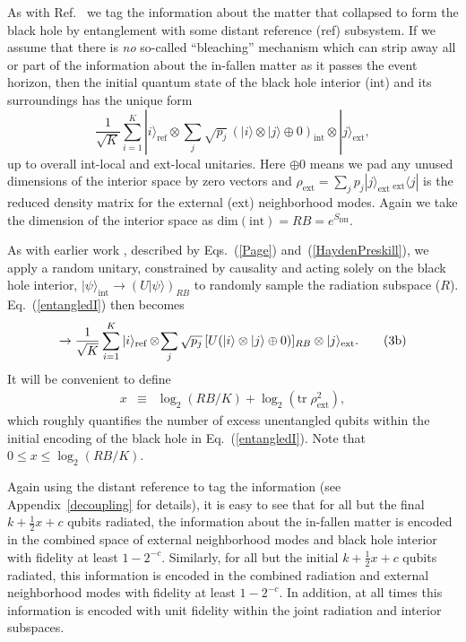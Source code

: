 \documentclass[twocolumn,aps,prl,amsmath,amssymb,floatfix]{revtex4}
\begin{document}
As with Ref.~ we tag the information about the
matter that collapsed to form the black hole by entanglement with
some distant reference (ref) subsystem. If we assume that there is
{\it no\/} so-called ``bleaching'' mechanism which can strip
away all or part of the information about the in-fallen matter as it
passes the event horizon, then the initial quantum state of the black hole
interior (int) and its surroundings has the unique form \cite{me}
\begin{equation}
\frac{1}{\sqrt{K}}\sum_{i=1}^K |i\rangle_{\text{ref}}\otimes
\sum_{j}\sqrt{p_j}\,(|i\rangle\otimes |j\rangle\oplus 0)_{\text{int}}
\otimes|j\rangle_{\text{ext}}, \tag{3a} \label{entangledI}
\end{equation}
up to overall int-local and ext-local unitaries.
Here $\oplus 0$ means we pad any unused dimensions of the interior
space by zero vectors \cite{me} and
$\rho_{\text{ext}}=\sum_jp_j|j\rangle_{\text{ext}}%
\,{}_{\text{ext}}\!\langle j|$
is the reduced density matrix for the external (ext) neighborhood modes.
Again we take the dimension of the interior space as
$\text{dim}(\text{int})= R B= e^{S_{\text{BH}}}$.

As with earlier work \cite{Page93,Hayden07}, described by Eqs.~(\ref{Page})
and~(\ref{HaydenPreskill}), we apply a random unitary, constrained
by causality and acting solely on the black hole interior,
$|\psi\rangle_{\text{int}}\rightarrow (U|\psi\rangle)_{RB}$ to
randomly sample the radiation subspace ($R$). Eq.~(\ref{entangledI}) 
then becomes 
\begin{equation}
\rightarrow
\frac{1}{\sqrt{K}}\sum_{i=1}^K |i\rangle_{\text{ref}}\otimes
\!\sum_{j}\sqrt{p_j}\,[U(|i\rangle\otimes |j\rangle\oplus 0)]_{RB}
\otimes|j\rangle_{\text{ext}}.
\tag{3b} \label{entangledF}
\setcounter{equation}{3}
\end{equation}
It will be convenient to define
\begin{eqnarray}
x&\equiv& \log_2(RB/K) +\log_2 ({\text{tr}}\; \rho_{\text{ext}}^2),
\end{eqnarray}
which roughly quantifies the number of excess unentangled qubits
within the initial encoding of the black hole in Eq.~(\ref{entangledI}).
Note that $0\le x \le \log_2(RB/K)$.

Again using the distant reference to tag the information (see
Appendix~\ref{decoupling} for details), it is easy to see that for all
but the final $k+\frac{1}{2}x+c$ qubits radiated, the information about
the in-fallen matter is encoded in the combined space of external
neighborhood modes and black hole interior with fidelity at least
$1-2^{-c}$. Similarly, for all but the initial $k+\frac{1}{2}x+c$
qubits radiated, this information is encoded in the combined radiation
and external neighborhood modes with fidelity at least $1-2^{-c}$.
In addition, at all times this information is encoded with unit
fidelity within the joint radiation and interior subspaces.
\end{document}
